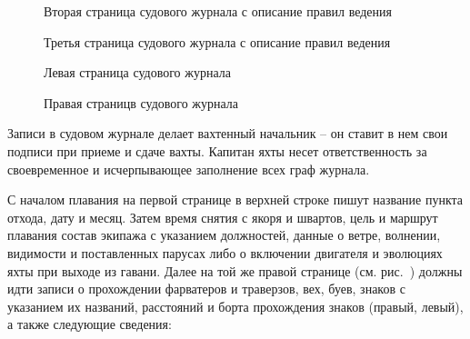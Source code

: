 \begin{figure*}
  \begin{minipage}{0.49\textwidth}
    \centering{}
    \caption{Вторая страница судового журнала с описание правил ведения}
    \label{fig:j-page-1}
  \end{minipage}
  \hfill\hfill
  \begin{minipage}{0.49\textwidth}
    \centering{}
    \caption{Третья страница судового журнала с описание правил ведения}
    \label{fig:j-page-2}
  \end{minipage}
\end{figure*} 

\begin{figure*}
  \begin{minipage}{0.49\textwidth}
    \centering{}
    \caption{Левая страница судового журнала}
    \label{fig:j-page-3}
  \end{minipage}
  \hfill\hfill
  \begin{minipage}{0.49\textwidth}
    \centering{}
    \caption{Правая страницв судового журнала}
    \label{fig:j-page-4}
  \end{minipage}
\end{figure*} 

Записи в судовом журнале делает вахтенный начальник \--- он ставит в
нем свои подписи при приеме и сдаче вахты. Капитан яхты несет
ответственность за своевременное и исчерпывающее заполнение всех граф
журнала.
 
С началом плавания на первой странице в верхней строке пишут название
пункта отхода, дату и месяц. Затем время снятия с якоря и швартов,
цель и маршрут плавания состав экипажа с указанием должностей, данные
о ветре, волнении, видимости и поставленных парусах либо о включении
двигателя и эволюциях яхты при выходе из гавани. Далее на той же
правой странице (см. рис.~) должны идти записи о
прохождении фарватеров и траверзов, вех, буев, знаков с указанием их
названий, расстояний и борта прохождения знаков (правый, левый), а
также следующие сведения:

